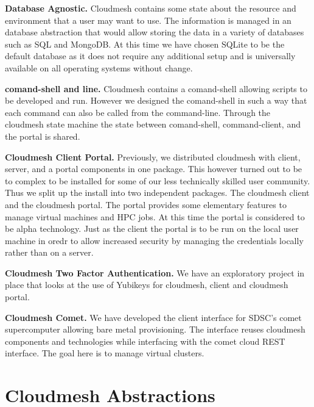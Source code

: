 \begin{description}
\item{\bf Database Agnostic.} Cloudmesh contains some state about the
resource and environment that a user may want to use. The information
is managed in an database abstraction that would allow storing the
data in a variety of databases such as SQL and MongoDB. At this time
we have chosen SQLite to be the default database as it does not
require any additional setup and is universally available on all
operating systems without change.

\item{\bf comand-shell and line.} Cloudmesh contains a comand-shell
allowing scripts to be developed and run. However we designed the
comand-shell in such a way that each command can also be called from
the command-line. Through the cloudmesh state machine the state
between comand-shell, command-client, and the portal is shared.

\item{\bf Cloudmesh Client Portal.} Previously, we distributed
cloudmesh with client, server, and a portal components in one
package. This however turned out to be to complex to be installed for
some of our less technically skilled user community. Thus we split up
the install into two independent packages. The cloudmesh client and
the cloudmesh portal. The portal provides some elementary features to
manage virtual machines and HPC jobs. At this time the portal is
considered to be alpha technology. Just as the client the portal is to
be run on the local user machine in oredr to allow increased security
by managing the credentials locally rather than on a server.

\item{\bf Cloudmesh Two Factor Authentication.} We have an
exploratory project in place that looks at the use of Yubikeys for
cloudmesh, client and cloudmesh portal.

\item{\bf Cloudmesh Comet.} We have  developed the client
interface for SDSC’s comet supercomputer allowing bare metal
provisioning. The interface reuses cloudmesh components and
technologies while interfacing with the comet cloud REST
interface. The goal here is to manage virtual clusters.

\end{description}




\section{Cloudmesh Abstractions}\label{S:abstraction}


